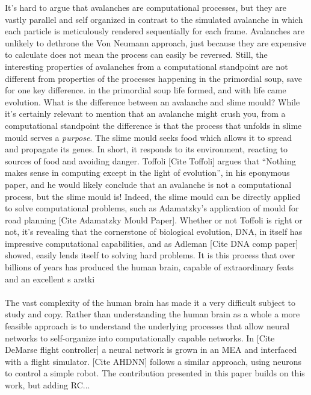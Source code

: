 It's hard to argue that avalanches are computational processes, but they are
vastly parallel and self organized in contrast to the simulated avalanche in
which each particle is meticulously rendered sequentially for each frame.
Avalanches are unlikely to dethrone the Von Neumann approach, just because they
are expensive to calculate does not mean the process can easily be reversed.
%
Still, the interesting properties of avalanches from a computational standpoint
are not different from properties of the processes happening in the primordial
soup, save for one key difference. in the primordial soup life formed, and with
life came evolution.
%
What is the difference between an avalanche and slime mould? While it's
certainly relevant to mention that an avalanche might crush you, from a
computational standpoint the difference is that the process that unfolds in
slime mould serves a \emph{purpose}.
The slime mould seeks food which allows it to
spread and propagate its genes. In short, it responds to its environment,
reacting to sources of food and avoiding danger.
Toffoli [Cite Toffoli] argues that ``Nothing makes
sense in computing except in the light of evolution'', in his eponymous paper,
and he would likely conclude that an avalanche is not a computational process,
but the slime mould is!
%
Indeed, the slime mould can be directly applied to solve computational problems,
such as Adamatzky's application of mould for road planning [Cite Adamatzky Mould
Paper].
%
Whether or not Toffoli is right or not, it's revealing that the cornerstone of
biological evolution, DNA, in itself has impressive computational capabilities,
and as Adleman [Cite DNA comp paper] showed, easily lends itself to solving hard
problems.
%
It is this process that over billions of years has produced the human brain,
capable of extraordinary feats and an excellent s                     arstki
\\ \\
The vast complexity of the human brain has made it a very difficult subject to
study and copy. Rather than understanding the human brain as a whole a more
feasible approach is to understand the underlying processes that allow neural
networks to self-organize into computationally capable networks.
In [Cite DeMarse flight controller] a neural network is grown in an MEA and
interfaced with a flight simulator. [Cite AHDNN] follows a similar approach,
using neurons to control a simple robot. The contribution presented in this
paper builds on this work, but adding RC...

\cleardoublepage

